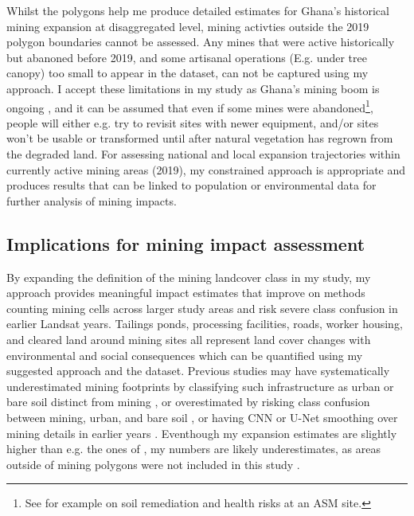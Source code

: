 \documentclass[]{interact}
\begin{document}
Whilst the polygons help me produce detailed estimates for Ghana's historical mining expansion at disaggregated level, mining activties outside the 2019 polygon boundaries cannot be assessed. Any mines that were active historically but abanoned before 2019, and some artisanal operations (E.g. under tree canopy) too small to appear in the dataset, can not be captured using my approach. I accept these limitations in my study as Ghana's mining boom is ongoing \citep{asori2022illegal,asiedu2023Assessing,siachiwena2025benefits}, and it can be assumed that even if some mines were abandoned\footnote{See for example \citet{mensah2025Health} on soil remediation and health risks at an ASM site.}, people will either e.g. try to revisit sites with newer equipment, and/or sites won't be usable or transformed until after natural vegetation has regrown from the degraded land. For assessing national and local expansion trajectories within currently active mining areas (2019), my constrained approach is appropriate and produces results that can be linked to population or environmental data for further analysis of mining impacts.

\subsection{Implications for mining impact assessment}
By expanding the definition of the mining landcover class in my study, my approach provides meaningful impact estimates that improve on methods counting mining cells across larger study areas and risk severe class confusion in earlier Landsat years. Tailings ponds, processing facilities, roads, worker housing, and cleared land around mining sites all represent land cover changes with environmental and social consequences \citep{mcquilken2016Artisanal,andrews2018Land} which can be quantified using my suggested approach and the \citet{maus2022update} dataset. Previous studies may have systematically underestimated mining footprints by classifying such infrastructure as urban or bare soil distinct from mining \citep{barenblitt2021large}, or overestimated by risking class confusion between mining, urban, and bare soil \citep{snapir2017Mapping}, or having CNN or U-Net smoothing over mining details in earlier years \citep{ma2019Deep,ball2017Comprehensive,kattenborn2021Review}. Eventhough my expansion estimates are slightly higher than e.g. the ones of \citet{barenblitt2021large}, my numbers are likely underestimates, as areas outside of mining polygons \citet{maus2022update} were not included in this study \citep{gallwey2020Sentinel2}.
\end{document}
